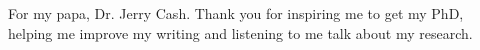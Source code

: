For my papa, Dr. Jerry Cash.  Thank you for inspiring me to get my PhD, helping me improve my writing and listening to me talk about my research. 
